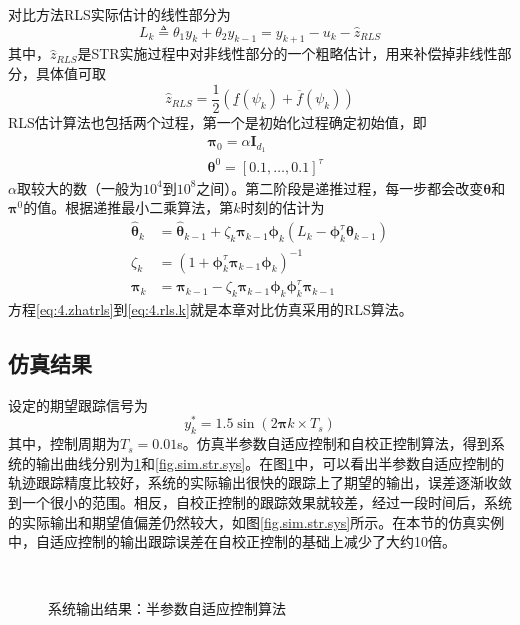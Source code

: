 对比方法RLS实际估计的线性部分为
\begin{equation}\label{eq:4.zrls}
L_{k}\triangleq\theta_{1}y_{k} + \theta_{2} y_{k-1}=y_{k+1}-u_{k}-\hat{z}_{RLS}
\end{equation}
其中，$\hat{z}_{RLS}$是STR实施过程中对非线性部分的一个粗略估计，用来补偿掉非线性部分，具体值可取
\begin{equation}\label{eq:4.zhatrls}
\hat{z}_{RLS}=\frac12 (\underline{f}(\psi_{k})+\overline{f}(\psi_{k})) 
\end{equation}
RLS估计算法也包括两个过程，第一个是初始化过程确定初始值，即
\begin{equation}\label{eq:4.rls.0}
\begin{split}
&\bm{\pi}_{0}=\alpha \bm{I}_{d_{1}}\\
&\bm{\theta}^{0}=[0.1,\dots,0.1]^{\tau}
\end{split}
\end{equation}
$\alpha$取较大的数（一般为$10^{4}$到$10^{8}$之间）。第二阶段是递推过程，每一步都会改变$\bm{\theta}$和$\bm{\pi}^{0}$的值。根据递推最小二乘算法，第$k$时刻的估计为
\begin{equation}\label{eq:4.rls.k}
\begin{split}
\hat{\bm{\theta}}_{k}&=\hat{\bm{\theta}}_{k-1}+ \zeta_{k} \bm{\pi}_{k-1} \bm{\phi}_{k} (L_{k}-\bm{\phi}_k^\tau \bm{\theta}_{k-1})\\
\zeta_k&=(1+\bm{\phi}_{k}^{\tau} \bm{\pi}_{k-1} \bm{\phi}_{k})^{-1}\\
\bm{\pi}_{k}&=\bm{\pi}_{k-1}-\zeta_k \bm{\pi}_{k-1} \bm{\phi}_{k} \bm{\phi}_{k}^{\tau} \bm{\pi}_{k-1}
\end{split}
\end{equation}
方程\eqref{eq:4.zhatrls}到\eqref{eq:4.rls.k}就是本章对比仿真采用的RLS算法。

\subsection{仿真结果}\label{sect:4.4.2}
设定的期望跟踪信号为
\begin{equation}\label{eq:4.sim.yd}
y_{k}^{*} = 1.5\sin(2\bm{\pi} k\times T_{s})
\end{equation}
其中，控制周期为$T_{s}=0.01$s。仿真半参数自适应控制和自校正控制算法，得到系统的输出曲线分别为\ref{fig.sim.elm.sys}和\ref{fig.sim.str.sys}。在图\ref{fig.sim.elm.sys}中，可以看出半参数自适应控制的轨迹跟踪精度比较好，系统的实际输出很快的跟踪上了期望的输出，误差逐渐收敛到一个很小的范围。相反，自校正控制的跟踪效果就较差，经过一段时间后，系统的实际输出和期望值偏差仍然较大，如图\ref{fig.sim.str.sys}所示。在本节的仿真实例中，自适应控制的输出跟踪误差在自校正控制的基础上减少了大约10倍。
\begin{figure}[!htb]
	\centering
	\\
	\caption{系统输出结果：半参数自适应控制算法}
	\label{fig.sim.elm.sys}
\end{figure}

